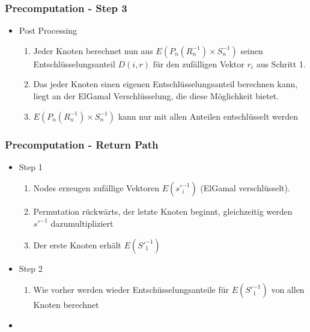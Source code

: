 \documentclass[t, xcolor=dvipsnames]{beamer}
\begin{document}
\begin{frame}
	\frametitle{Precomputation - Step 3}
	\begin{itemize}
		\item Post Processing
		\begin{enumerate}
			\item Jeder Knoten berechnet nun aus $E(P_n(R_n^{-1}) \times S_n^{-1})$ seinen Entschlüsselungsanteil $D(i, r)$ für den zufälligen Vektor $r_i$ aus Schritt 1.
			\item Das jeder Knoten einen eigenen Entschlüsselungsanteil berechnen kann, liegt an der ElGamal Verschlüsselung, die diese Möglichkeit bietet.
			\item $E(P_n(R_n^{-1}) \times S_n^{-1})$ kann nur mit allen Anteilen entschlüsselt werden
		\end{enumerate}
		
	
	\end{itemize}
	\vspace{\fill}
\end{frame}

\begin{frame}
	\frametitle{Precomputation - Return Path}
	\begin{itemize}
		
		\item Step 1
		\begin{enumerate}
			\item Nodes erzeugen zufällige Vektoren $E({s'}_i^{-1})$ (ElGamal verschlüsselt).
			\item Permutation rückwärts, der letzte Knoten beginnt, gleichzeitig werden $s'^{-1}$ dazumultipliziert
			\item Der erste Knoten erhält $E({S'}_1^{-1})$
		\end{enumerate}
		\item Step 2
		\begin{enumerate}
			\item Wie vorher werden wieder Entschüsselungsanteile für $E({S'}_1^{-1})$ von allen Knoten berechnet
		\end{enumerate}
		\item 
		
		 
	\end{itemize}
	\vspace{\fill}
\end{frame}
\end{document}
